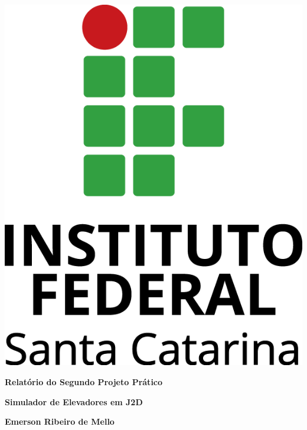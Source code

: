 \documentclass[11pt]{report}
\begin{document}

\pagestyle{empty}


\begin{center}

\includegraphics[scale=.7]{figuras/ifsc-logo-v}
\vspace{8cm}

{\huge \bfseries Relatório do Segundo Projeto Prático}

\vspace{.5cm}

{\large \bfseries Simulador de Elevadores em J2D }

\vfill

{\large \bfseries Emerson Ribeiro de Mello}

\end{center}
\end{document}
